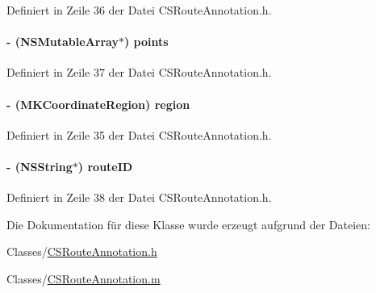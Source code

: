 Definiert in Zeile 36 der Datei CSRouteAnnotation.h.\hypertarget{interface_c_s_route_annotation_ab02d74b832bc93750f3406722fe41d31}{
\paragraph[{points}]{\setlength{\rightskip}{0pt plus 5cm}-\/ (NSMutableArray$\ast$) points}\hfill}
\label{interface_c_s_route_annotation_ab02d74b832bc93750f3406722fe41d31}


Definiert in Zeile 37 der Datei CSRouteAnnotation.h.\hypertarget{interface_c_s_route_annotation_a006eed04181dd41b76f25c171b8e7f99}{
\paragraph[{region}]{\setlength{\rightskip}{0pt plus 5cm}-\/ (MKCoordinateRegion) region}\hfill}
\label{interface_c_s_route_annotation_a006eed04181dd41b76f25c171b8e7f99}


Definiert in Zeile 35 der Datei CSRouteAnnotation.h.\hypertarget{interface_c_s_route_annotation_a7f8991c355eb08ae7213b44ed8110f1a}{
\paragraph[{routeID}]{\setlength{\rightskip}{0pt plus 5cm}-\/ (NSString$\ast$) routeID}\hfill}
\label{interface_c_s_route_annotation_a7f8991c355eb08ae7213b44ed8110f1a}


Definiert in Zeile 38 der Datei CSRouteAnnotation.h.

Die Dokumentation für diese Klasse wurde erzeugt aufgrund der Dateien:\begin{DoxyCompactItemize}
\item 
Classes/\hyperlink{_c_s_route_annotation_8h}{CSRouteAnnotation.h}\item 
Classes/\hyperlink{_c_s_route_annotation_8m}{CSRouteAnnotation.m}\end{DoxyCompactItemize}

